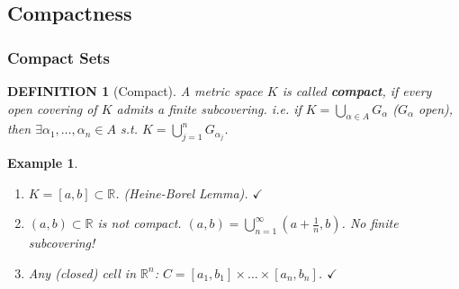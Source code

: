 \documentclass[12pt]{article}
\theoremstyle{blueplain}
\theoremstyle{bluedef}
\newtheorem{definition}{DEFINITION}[section]
\theoremstyle{blueremark}
\newtheorem{example}{Example}[section]
\newcommand{\R}{\mathbb{R}}
\numberwithin{equation}{section}
\begin{document}
      \clearpage


      \subsection{Compactness}

      \subsubsection{Compact Sets}

      \begin{definition}[Compact]
        A metric space $K$ is called \textbf{compact}, if every open covering of $K$ admits a finite subcovering.
        i.e. if $K = \bigcup_{\alpha \in A} G_\alpha$ ($G_\alpha$ open), then $\exists \alpha_1, \ldots, \alpha_n \in A$ s.t. $K = \bigcup_{j=1}^n G_{\alpha_j}$.
      \end{definition}

      \begin{example}
        \begin{enumerate}
          \item $K = [a,b] \subset \R$. (Heine-Borel Lemma). $\checkmark$
          \item $(a,b) \subset \R$ is not compact.
                $(a,b) = \bigcup_{n=1}^\infty (a + \frac{1}{n}, b)$. No finite subcovering!
          \item Any (closed) cell in $\R^n$: $C = [a_1, b_1] \times \dots \times [a_n, b_n]$. $\checkmark$
        \end{enumerate}
      \end{example}
\end{document}
